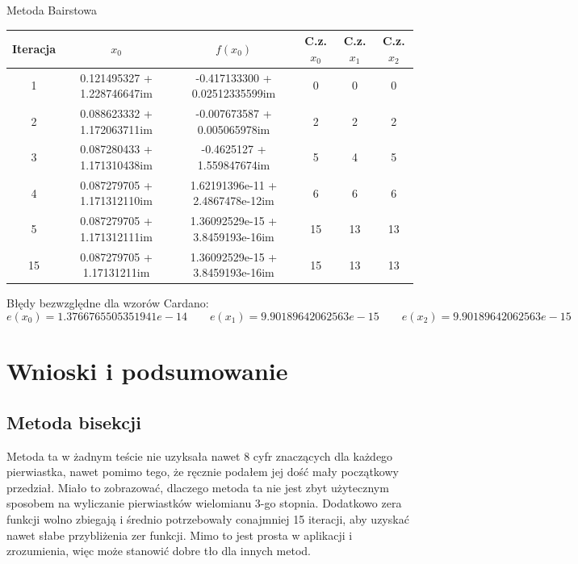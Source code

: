 \documentclass[a4paper]{article}
\begin{document}
    \vspace{5mm}

    \begin{center}
        Metoda Bairstowa
    \end{center}
    \begin{center}
        \begin{tabular}{|c|c|c|c|c|c|} 
            \hline
            Iteracja & $x_0$ & $f(x_0)$ & C.z. $x_0$ & C.z. $x_1$ & C.z. $x_2$ \\
            \hline
            1 & 0.121495327 + 1.228746647im & -0.417133300 + 0.02512335599im & 0 & 0 & 0 \\ 
            \hline
            2 & 0.088623332 + 1.172063711im & -0.007673587 + 0.005065978im & 2 & 2 & 2 \\ 
            \hline
            3 & 0.087280433 + 1.171310438im & -0.4625127 + 1.559847674im & 5 & 4 & 5 \\
            \hline
            4 & 0.087279705 + 1.171312110im &  1.62191396e-11 + 2.4867478e-12im & 6 & 6 & 6 \\
            \hline
            5 & 0.087279705 + 1.171312111im &  1.36092529e-15 + 3.8459193e-16im & 15 & 13 & 13 \\
            \hline
            15 & 0.087279705 + 1.17131211im &  1.36092529e-15 + 3.8459193e-16im & 15 & 13 & 13 \\
            \hline
        \end{tabular}
    \end{center}

    \vspace{5mm}

    \begin{center}
        Błędy bezwzględne dla wzorów Cardano:
        \[
            e(x_0) = 1.3766765505351941e-14 \qquad e(x_1) = 9.90189642062563e-15 \qquad e(x_2) = 9.90189642062563e-15
        \]
    \end{center}
    
\newpage
\section{Wnioski i podsumowanie}
    \subsection{Metoda bisekcji}
        Metoda ta w żadnym teście nie uzyksała nawet 8 cyfr znaczących dla każdego pierwiastka, nawet
        pomimo tego, że ręcznie podałem jej dość mały początkowy przedział. Miało to zobrazować, dlaczego
        metoda ta nie jest zbyt użytecznym sposobem na wyliczanie pierwiastków wielomianu 3-go stopnia.
        Dodatkowo zera funkcji wolno zbiegają i średnio potrzebowały conajmniej 15 iteracji, aby uzyskać
        nawet słabe przybliżenia zer funkcji. Mimo to jest prosta w aplikacji i zrozumienia, więc może stanowić
        dobre tło dla innych metod.
        
\end{document}
